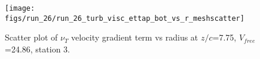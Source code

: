 \begin{figure}[H]
\centering
\texttt{[image: figs/run\_26/run\_26\_turb\_visc\_ettap\_bot\_vs\_r\_meshscatter]}
\caption{Scatter plot of $\nu_T$ velocity gradient term vs radius at $z/c$=7.75, $V_{free}$=24.86, station 3.}
\label{fig:run_26_turb_visc_ettap_bot_vs_r_meshscatter}
\end{figure}


